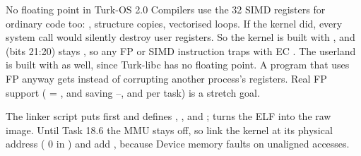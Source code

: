 \documentclass[11pt,a4paper]{article}
\begin{document}

\begin{decisionbox}{No floating point in Turk-OS 2.0}
Compilers use the 32 SIMD registers for ordinary code too: , structure copies, vectorised loops. If the
kernel did, every system call would silently destroy user registers. So the kernel is built with
, and  (bits 21:20) stays , so any FP or SIMD instruction
traps with EC . The userland is built with  as well, since Turk-libc has no
floating point. A program that uses FP anyway gets  instead of corrupting another process's registers.
Real FP support ( = , and saving --,  and  per task)
is a stretch goal.
\end{decisionbox}

The linker script puts  first and defines , ,  and
;  turns the ELF into the raw image. Until Task 18.6 the MMU stays
off, so link the kernel at its physical address ( 0 in ) and add
, because Device memory faults on unaligned accesses.
\end{document}
